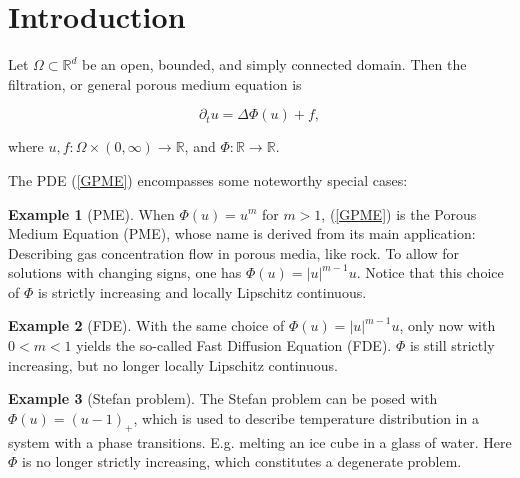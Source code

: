 \documentclass[11pt, a4paper]{article}
\begin{document}
\theoremstyle{definition}
\newtheorem{mydef}{Definition}[section]
\newtheorem{example}{Example}%

\newtheorem{obs}{Observation}
\newtheorem{rem}{Remark}




\newpage
\section{Introduction}

Let $\Omega \subset \mathbb{R}^d$ be an open, bounded, and simply connected domain. Then the filtration, or general porous medium equation is

\begin{equation}
\label{GPME}
	\partial_t u = \Delta \Phi(u) + f,
\end{equation}

 where $u, f: \Omega \times (0,\infty) \to \mathbb{R}$, and $\Phi: \mathbb{R} \to \mathbb{R}$.
 
The PDE (\ref{GPME}) encompasses some noteworthy special cases:
\begin{example}[PME]
When $\Phi(u) = u^m$ for $m>1$, (\ref{GPME}) is the Porous Medium Equation (PME), whose name is derived from its main application: Describing gas concentration flow in porous media, like rock. To allow for solutions with changing signs, one has $\Phi(u) = |u|^{m-1}u$. Notice that this choice of $\Phi$ is strictly increasing and locally Lipschitz continuous.
\end{example}

\begin{example}[FDE]
With the same choice of $\Phi(u) = |u|^{m-1}u$, only now with $0<m<1$ yields the so-called Fast Diffusion Equation (FDE). $\Phi$ is still strictly increasing, but no longer locally Lipschitz continuous.
\end{example}

\begin{example}[Stefan problem]
The Stefan problem can be posed with $\Phi(u) = (u-1)_+$, which is used to describe temperature distribution in a system with a phase transitions. E.g. melting an ice cube in a glass of water. Here $\Phi$ is no longer strictly increasing, which constitutes a degenerate problem.
\end{example}
\end{document}
